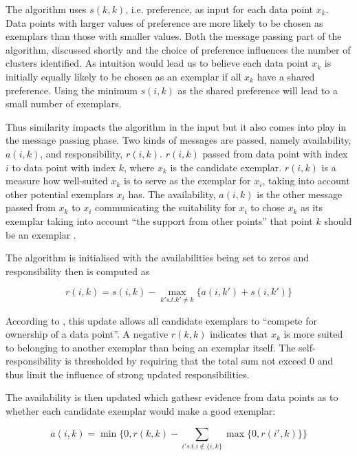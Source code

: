 \documentclass[a4paper]{article}
\begin{document}
The algorithm uses $s(k,k)$, i.e. preference, as input for each data point $x_k$. Data points with larger values of preference are more likely to be chosen as exemplars than those with smaller values. Both the message passing part of the algorithm, discussed shortly and the choice of preference influences the number of clusters identified. As intuition would lead us to believe each data point $x_k$ is initially equally likely to be chosen as an exemplar if all $x_k$ have a shared preference. Using the minimum $s(i,k)$ as the shared preference will lead to a small number of exemplars.

Thus similarity impacts the algorithm in the input but it also comes into play in the message passing phase. Two kinds of messages are passed, namely availability, $a(i,k)$, and responsibility, $r(i,k)$. $r(i,k)$ passed from data point with index $i$ to data point with index $k$, where $x_k$ is the candidate exemplar. $r(i,k)$ is a measure how well-suited $x_k$ is to serve as the exemplar for $x_i$, taking into account other potential exemplars $x_i$ has. The availability, $a(i,k)$ is the other message passed from $x_k$ to $x_i$ communicating the suitability for $x_i$ to chose $x_k$ as its exemplar taking into account ``the support from other points'' that point $k$ should be an exemplar \citep{frey07}. %

The algorithm is initialised with the availabilities being set to zeros and responsibility then is computed as

\begin{equation}\label{eq:resp}
r(i,k) = s(i,k) - \max_{k' s.t. k' \ne k}\{a(i,k') + s(i,k')\}
\end{equation}

According to \citet{frey07}, this update allows all candidate exemplars to ``compete for ownership of a data point''. A negative $r(k,k)$ indicates that $x_k$ is more suited to belonging to another exemplar than being an exemplar itself. The self-responsibility is thresholded by requiring that the total sum not exceed 0 and thus limit the influence of strong updated responsibilities. 

The availability is then updated which gathesr evidence from data points as to whether each candidate exemplar would make a good exemplar:

\begin{equation}\label{eq:avail}
a(i,k) = \min\{0, r(k,k) - \sum_{i' s.t. i \notin \{i,k\}}\max\{0,r(i',k)\}\}
\end{equation}
\end{document}
